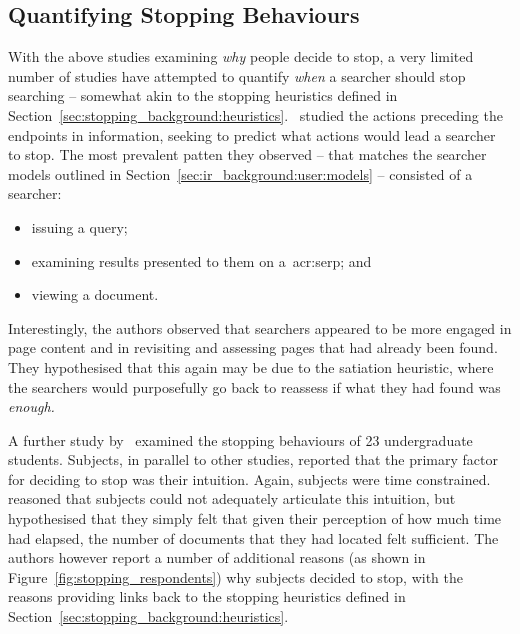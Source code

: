 \subsection{Quantifying Stopping Behaviours}
With the above studies examining \emph{why} people decide to stop, a very limited number of studies have attempted to quantify \emph{when} a searcher should stop searching -- somewhat akin to the stopping heuristics defined in Section~\ref{sec:stopping_background:heuristics}.~\cite{toms2009predicting_stopping} studied the actions preceding the endpoints in information, seeking to predict what actions would lead a searcher to stop. The most prevalent patten they observed -- that matches the searcher models outlined in Section~\ref{sec:ir_background:user:models} -- consisted of a searcher:

\vspace{-5mm}
\begin{itemize}
    \item{issuing a query;}
    \item{examining results presented to them on a~\gls{acr:serp}; and}
    \item{viewing a document.}
\end{itemize}
\vspace{-5mm}

Interestingly, the authors observed that searchers appeared to be more engaged in page content and in revisiting and assessing pages that had already been found. They hypothesised that this again may be due to the satiation heuristic, where the searchers would purposefully go back to reassess if what they had found was \emph{enough.}

A further study by~\cite{dostert2009satisficing} examined the stopping behaviours of 23 undergraduate students. Subjects, in parallel to other studies, reported that the primary factor for deciding to stop was their intuition. Again, subjects were time constrained.~\cite{dostert2009satisficing} reasoned that subjects could not adequately articulate this intuition, but hypothesised that they simply felt that given their perception of how much time had elapsed, the number of documents that they had located felt sufficient. The authors however report a number of additional reasons (as shown in Figure~\ref{fig:stopping_respondents}) why subjects decided to stop, with the reasons providing links back to the stopping heuristics defined in Section~\ref{sec:stopping_background:heuristics}.

